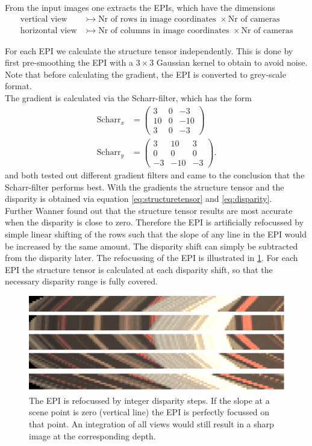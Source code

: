 \documentclass  [
  paper    = a4,
  BCOR     = 10mm,
  twoside,
  fontsize = 12pt,
  fleqn,
  toc      = bibnumbered,
  toc      = listofnumbered,
  numbers  = noendperiod,
  headings = normal,
  listof   = leveldown,
  version  = 3.03
]                                       {scrreprt}
\begin{document}
 From the input images one extracts the EPIs, which have the dimensions
 \begin{align*}
 \text{vertical view}&\rightarrowtail \text{Nr of rows in image coordinates }\times \text{Nr of cameras}\\
 \text{horizontal view}&\rightarrowtail \text{Nr of columns in image coordinates }\times \text{Nr of cameras}
 \end{align*}
 
 For each EPI we calculate the structure tensor independently. This is done by first pre-smoothing the EPI with a $3\times3$ Gaussian kernel to obtain to avoid noise. Note that before calculating the gradient, the EPI is converted to grey-scale format.\\
 The gradient is calculated via the Scharr-filter, which has the form
 \begin{align}\label{key}
 \text{Scharr}_x &= \left(\begin{matrix}
 3&0&-3\\
 10&0&-10\\
 3&0&-3
 \end{matrix}\right)
\\
 \text{Scharr}_y &= \left(\begin{matrix}
 3&10&3\\
 0&0&0\\
 -3&-10&-3
 \end{matrix}\right).
 \end{align}
 \cite{wanner2014orientation} and \cite{diebold2016light} both tested out different gradient filters and came to the conclusion that the Scharr-filter performs best. With the gradients the structure tensor and the disparity is obtained via equation \ref{eq:structuretensor} and \ref{eq:disparity}.\\
 Further Wanner found out that the structure tensor results are most accurate when the disparity is close to zero. Therefore the EPI is artificially refocussed by simple linear shifting of the rows such that the slope of any line in the EPI would be increased by the same amount. The disparity shift can simply be subtracted from the disparity later. The refocussing of the EPI is illustrated in \ref{fig:refocusedcut}. For each EPI the structure tensor is calculated at each disparity shift, so that the necessary disparity range is fully covered.  \\
 \begin{figure}
 	\centering
 	\includegraphics[width=0.7\linewidth]{images/refocused_cut}
 	\caption[Refocussed EPI]{The EPI is refocussed by integer disparity steps. If the slope at a scene point is zero (vertical line) the EPI is perfectly focussed on that point. An integration of all views would still result in a sharp image at the corresponding depth.}
 	\label{fig:refocusedcut}
 \end{figure}
 
\end{document}
